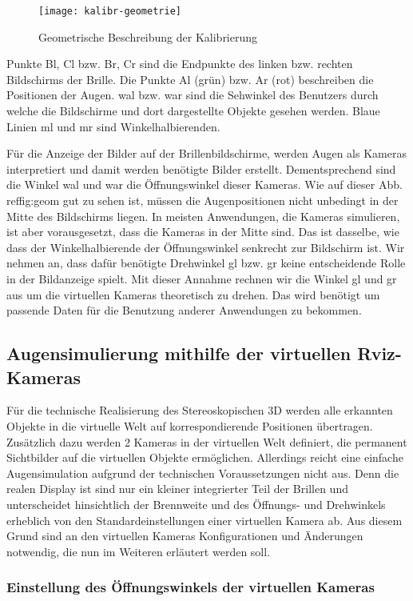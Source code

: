 \begin{figure}[h]
   \centering
   \texttt{[image: kalibr-geometrie]}
   \caption{Geometrische Beschreibung der Kalibrierung}
   \label{fig:geom}
\end{figure}

Punkte Bl, Cl bzw. Br, Cr sind die Endpunkte des linken bzw. rechten Bildschirms der Brille.
Die Punkte Al (grün) bzw. Ar (rot) beschreiben die Positionen der Augen.
wal bzw. war sind die Sehwinkel des Benutzers durch welche die Bildschirme und dort dargestellte Objekte gesehen werden. 
Blaue Linien ml und mr sind Winkelhalbierenden.

Für die Anzeige der Bilder auf der Brillenbildschirme, werden Augen als Kameras interpretiert und damit werden benötigte Bilder erstellt.
Dementsprechend sind die Winkel wal und war die Öffnungswinkel dieser Kameras.
Wie auf dieser Abb. ref{fig:geom} gut zu sehen ist, müssen die Augenpositionen nicht unbedingt in der Mitte des Bildschirms liegen.
In meisten Anwendungen, die Kameras simulieren, ist aber vorausgesetzt, dass die Kameras in der Mitte sind.
Das ist dasselbe, wie dass der Winkelhalbierende der Öffnungswinkel senkrecht zur Bildschirm ist.
Wir nehmen an, dass dafür benötigte Drehwinkel gl bzw. gr keine entscheidende Rolle in der Bildanzeige spielt.
Mit dieser Annahme rechnen wir die Winkel gl und gr aus  um die virtuellen Kameras theoretisch zu drehen.
Das wird benötigt um passende Daten für die Benutzung anderer Anwendungen zu bekommen.

\subsection{Augensimulierung mithilfe der virtuellen Rviz-Kameras }
Für die technische Realisierung des Stereoskopischen 3D werden alle erkannten Objekte in die virtuelle Welt auf korrespondierende Positionen übertragen. Zusätzlich dazu werden 2 Kameras in der virtuellen Welt definiert, die permanent Sichtbilder auf die virtuellen Objekte ermöglichen. Allerdings reicht eine einfache Augensimulation aufgrund der technischen Voraussetzungen nicht aus. Denn die realen Display ist sind nur ein kleiner integrierter Teil der Brillen und unterscheidet hinsichtlich der Brennweite und des Öffnungs- und Drehwinkels erheblich von den Standardeinstellungen einer virtuellen Kamera ab. Aus diesem Grund sind an den virtuellen Kameras Konfigurationen und Änderungen notwendig, die nun im Weiteren erläutert werden soll. 


\subsubsection{Einstellung des Öffnungswinkels der virtuellen Kameras}

